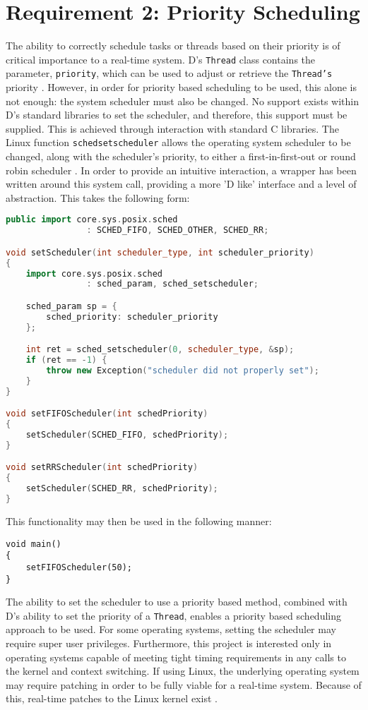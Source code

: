 \section{Requirement 2: Priority Scheduling}
The ability to correctly schedule tasks or threads based on their priority is of 
critical importance to a real-time system. D's \texttt{Thread} class contains the
parameter, \texttt{priority}, which can be used to adjust or retrieve 
the \texttt{Thread's} priority \cite{core-thread}. 
However, in order for priority based scheduling to be used, this alone is not 
enough: the system scheduler must also be changed.
No support exists within D's standard libraries to set the scheduler, and therefore, 
this support must be supplied. 
This is achieved through interaction with standard C libraries. 
The Linux function \texttt{sched\textunderscore{}setscheduler} allows the operating system 
scheduler to be changed, along with the scheduler's priority, to either a 
first-in-first-out or round robin scheduler \cite{sched-setscheduler}. 
In order to provide an intuitive interaction, a wrapper has been written around
this system call, providing a more 'D like' interface and a level of
abstraction. This takes the following form:
\begin{lstlisting}[basicstyle=\small,language=C++]
public import core.sys.posix.sched 
                : SCHED_FIFO, SCHED_OTHER, SCHED_RR; 

void setScheduler(int scheduler_type, int scheduler_priority)
{
    import core.sys.posix.sched 
                : sched_param, sched_setscheduler; 

    sched_param sp = { 
        sched_priority: scheduler_priority 
    }; 

    int ret = sched_setscheduler(0, scheduler_type, &sp); 
    if (ret == -1) {
        throw new Exception("scheduler did not properly set");
    }
}

void setFIFOScheduler(int schedPriority)
{
    setScheduler(SCHED_FIFO, schedPriority);
}

void setRRScheduler(int schedPriority)
{
    setScheduler(SCHED_RR, schedPriority); 
}
\end{lstlisting}
This functionality may then be used in the following manner: 
\begin{lstlisting}[basicstyle=\small]
void main()
{
    setFIFOScheduler(50); 
}
\end{lstlisting}
The ability to set the scheduler to use a priority based method, combined with 
D's ability to set the priority of a \texttt{Thread}, enables a 
priority based scheduling approach to be used. 
For some operating systems, setting the scheduler may require super user privileges. 
Furthermore, this project is interested only in operating systems capable of meeting tight timing 
requirements in any calls to the kernel and context switching.
If using Linux, the underlying operating system may require patching in order 
to be fully viable for a real-time system. Because of this, real-time patches 
to the Linux kernel exist \cite{rt-wiki}. 

